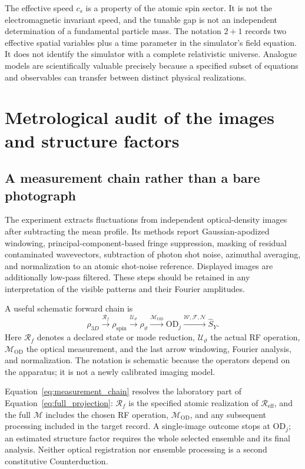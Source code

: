 \documentclass[11pt,a4paper]{article}
\theoremstyle{definition}
\theoremstyle{remark}
\begin{document}
The effective speed $c_s$ is a property of the atomic spin sector. It is not the electromagnetic invariant speed, and the tunable gap is not an independent determination of a fundamental particle mass. The notation $2+1$ records two effective spatial variables plus a time parameter in the simulator's field equation. It does not identify the simulator with a complete relativistic universe. Analogue models are scientifically valuable precisely because a specified subset of equations and observables can transfer between distinct physical realizations.\cite{analogue}

\section{Metrological audit of the images and structure factors}
\label{sec:metrology}
\subsection{A measurement chain rather than a bare photograph}
The experiment extracts fluctuations from independent optical-density images after subtracting the mean profile. Its methods report Gaussian-apodized windowing, principal-component-based fringe suppression, masking of residual contaminated wavevectors, subtraction of photon shot noise, azimuthal averaging, and normalization to an atomic shot-noise reference. Displayed images are additionally low-pass filtered. These steps should be retained in any interpretation of the visible patterns and their Fourier amplitudes.\cite{zhang2026}

A useful schematic forward chain is
\begin{equation}
 \rho_{3D}\xrightarrow{\mathcal R_f}\rho_{\mathrm{spin}}
 \xrightarrow{\mathcal U_\vartheta}\rho_\vartheta
 \xrightarrow{\mathcal M_{\mathrm{OD}}}\mathrm{OD}_j
 \xrightarrow{\mathcal W,\mathcal F,\mathcal N}\widehat S_Y.
 \label{eq:measurement_chain}
\end{equation}
Here $\mathcal R_f$ denotes a declared state or mode reduction, $\mathcal U_\vartheta$ the actual RF operation, $\mathcal M_{\mathrm{OD}}$ the optical measurement, and the last arrow windowing, Fourier analysis, and normalization. The notation is schematic because the operators depend on the apparatus; it is not a newly calibrated imaging model.

Equation~\eqref{eq:measurement_chain} resolves the laboratory part of Equation~\eqref{eq:full_projection}: $\mathcal R_f$ is the specified atomic realization of $\mathcal R_{\mathrm{eff}}$, and the full $\mathcal M$ includes the chosen RF operation, $\mathcal M_{\mathrm{OD}}$, and any subsequent processing included in the target record. A single-image outcome stops at $\mathrm{OD}_j$; an estimated structure factor requires the whole selected ensemble and its final analysis. Neither optical registration nor ensemble processing is a second constitutive Counterduction.\cite{foundation,zhang2026}
\end{document}
